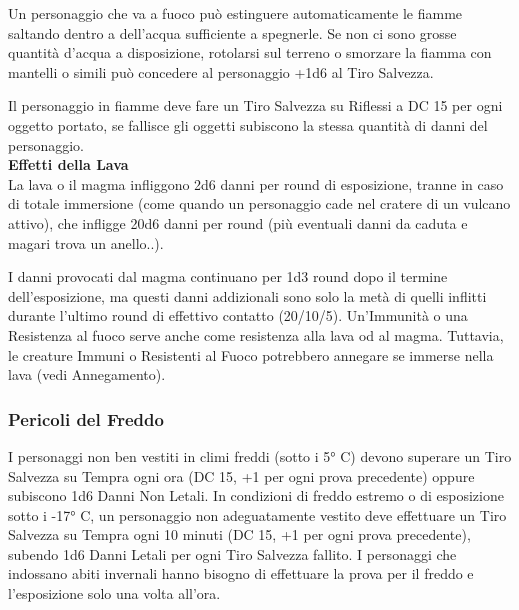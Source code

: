 \begin{multicols}{2}
Un personaggio che va a fuoco può estinguere automaticamente le fiamme saltando dentro a dell'acqua sufficiente a spegnerle. Se non ci sono grosse quantità d'acqua a disposizione, rotolarsi sul terreno o smorzare la fiamma con mantelli o simili può concedere al personaggio +1d6 al Tiro Salvezza.

Il personaggio in fiamme deve fare un Tiro Salvezza su Riflessi a DC 15 per ogni oggetto portato, se fallisce gli oggetti subiscono la stessa quantità di danni del personaggio.\\



\textbf{Effetti della Lava}\\

La lava o il magma infliggono 2d6 danni per round di esposizione, tranne in caso di totale immersione (come quando un personaggio cade nel cratere di un vulcano attivo), che infligge 20d6 danni per round (più eventuali danni da caduta e magari trova un anello..).

I danni provocati dal magma continuano per 1d3 round dopo il termine dell'esposizione, ma questi danni addizionali sono solo la metà di quelli inflitti durante l'ultimo round di effettivo contatto (20/10/5). Un'Immunità o una Resistenza al fuoco serve anche come resistenza alla lava od al magma. Tuttavia, le creature Immuni o Resistenti al Fuoco potrebbero annegare se immerse nella lava (vedi Annegamento).


\subsubsection{Pericoli del Freddo}

\label{pericoli-del-freddo}

I personaggi non ben vestiti in climi freddi (sotto i 5° C) devono superare un Tiro Salvezza su Tempra ogni ora (DC 15, +1 per ogni prova precedente) oppure subiscono 1d6 Danni Non Letali.
In condizioni di freddo estremo o di esposizione sotto i -17° C, un personaggio non adeguatamente vestito deve effettuare un Tiro Salvezza su Tempra ogni 10 minuti (DC 15, +1 per ogni prova precedente), subendo 1d6 Danni Letali per ogni Tiro Salvezza fallito. I personaggi che indossano abiti invernali hanno bisogno di effettuare la prova per il freddo e l'esposizione solo una volta all'ora.



\end{multicols}
